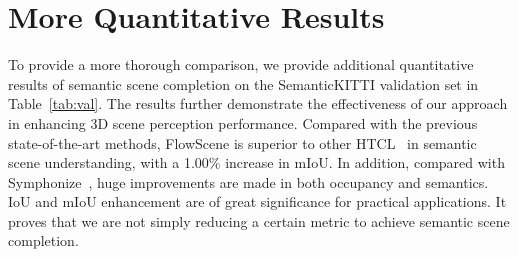 \section{More Quantitative Results}
\label{quantitative}

To provide a more thorough comparison, we provide additional quantitative results of semantic scene completion on the SemanticKITTI validation set in Table~\ref{tab:val}. The results further demonstrate the effectiveness of our approach in enhancing 3D scene perception performance.
Compared with the previous state-of-the-art methods, FlowScene is superior to other HTCL~\cite{li2024htcl} in semantic scene understanding, with a 1.00\% increase in mIoU. In addition, compared with Symphonize~\cite{jiang2024symphonize}, huge improvements are made in both occupancy and semantics. IoU and mIoU enhancement are of great significance for practical applications. It proves that we are not simply reducing a certain metric to achieve semantic scene completion.

